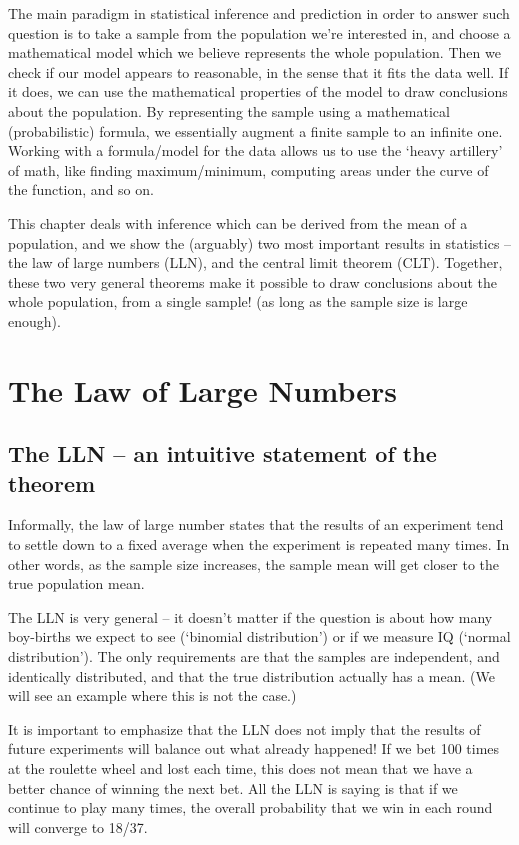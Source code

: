 The main paradigm in statistical inference and prediction in order to answer such question is to take a sample from the population we're interested in, and choose a mathematical model which we believe represents the whole population. Then we check if our model appears to reasonable, in the sense that it fits the data well. If it does, we can use the mathematical properties of the model to draw conclusions about the population. By representing the sample using a mathematical (probabilistic) formula, we essentially augment a finite sample to an infinite one. Working with a formula/model for the data allows us to use the `heavy artillery' of math, like finding maximum/minimum, computing areas under the curve of the function, and so on. 

This chapter deals with inference which can be derived from the mean of a population, and we show the (arguably) two most important results in statistics -- the law of large numbers (LLN), and the central limit theorem (CLT). Together, these two very general theorems make it possible to draw conclusions about the whole population, from a single sample! (as long as the sample size is large enough).


\section{The Law of Large Numbers}







\subsection{The LLN -- an intuitive statement of the theorem}
Informally, the law of large number states that the results of an experiment tend to settle down to a fixed average when the experiment is repeated many times. In other words, as the sample size increases, the sample mean will get closer to the true population mean.

The LLN is very general -- it doesn't matter if the question is about how many boy-births we expect to see (`binomial distribution') or if we measure IQ (`normal distribution'). The only requirements are that the samples are independent, and identically distributed, and that the true distribution actually has a mean. (We will see an example where this is not the case.)

It is important to emphasize that the LLN does not imply that the results of future experiments will balance out what already happened! If we bet 100 times at the roulette wheel and lost each time, this does not mean that we have a better chance of winning the next bet. All the LLN is saying is that if we continue to play many times, the overall probability that we win in each round will converge to 18/37.


